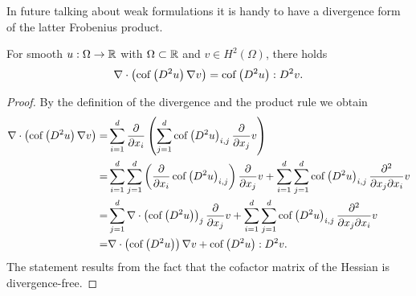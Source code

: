 In future talking about weak formulations it is handy to have a divergence form of the latter Frobenius product.
\begin{lemma} \label{la: An application of the divergernce product rule}
For smooth $u:\Omega \rightarrow \mathbb{R}$ with $\Omega \subset \mathbb{R}$ and $v\in H^2(\Omega)$, there holds
\[
		\nabla \cdot \left( \mycof {D^2 u } \nabla v \right) %
		= \mycof {D^2 u}: D^2 v.
\] 
\end{lemma}

\begin{proof}
By the definition of the divergence and the product rule we obtain
\begin{align*}
\nabla \cdot \left( \mycof {D^2 u } \nabla v \right) =&%
\sum_{i= 1}^{d} \dx {x_i} 	\left( \sum_{j= 1}^{d} \mycof {D^2 u }_{i,j} \dx{x_j} v \right)\\
=&  \sum_{i= 1}^{d} \sum_{j= 1}^{d}  \left(\dx {x_i} \mycof {D^2 u }_{i,j}  \right) \dx{x_j}v + \sum_{i= 1}^{d} \sum_{j= 1}^{d}  \mycof {D^2 u }_{i,j} \dxy{x_j}{x_i}v\\
=&  \sum_{j= 1}^{d}  \nabla \cdot \left(\mycof {D^2 u }\right)_j \dx{x_j}v + \sum_{i= 1}^{d} \sum_{j= 1}^{d}  \mycof {D^2 u }_{i,j} \dxy{x_j}{x_i}v\\
=&   \nabla \cdot \left(\mycof {D^2 u }\right) \nabla v+ \mycof {D^2 u }:D^2v.
\end{align*}
The statement results from the fact that the cofactor matrix of the Hessian is divergence-free.
\end{proof}
